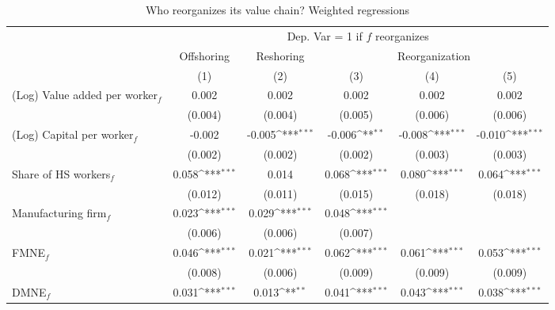 \begin{table}[htbp] \footnotesize \centering
\def\sym#1{\ifmmode^{#1}\else\(^{#1}\)\fi}
\caption{Who reorganizes its value chain? Weighted regressions \label{tab:reg_who_appendix}}
\renewcommand{\arraystretch}{1}
\begin{tabular}{l*{5}{c}}
\toprule
&\multicolumn{5}{c}{Dep. Var = 1 if $ f $ reorganizes} \\
\cmidrule(lr){2-6}
                &\multicolumn{1}{c}{Offshoring}&\multicolumn{1}{c}{Reshoring}&\multicolumn{3}{c}{Reorganization}                      \\\cmidrule(lr){2-2}\cmidrule(lr){3-3}\cmidrule(lr){4-6}
                &\multicolumn{1}{c}{(1)}         &\multicolumn{1}{c}{(2)}         &\multicolumn{1}{c}{(3)}         &\multicolumn{1}{c}{(4)}         &\multicolumn{1}{c}{(5)}         \\
\midrule
(Log) Value added per worker$ _f$&    0.002         &    0.002         &    0.002         &    0.002         &    0.002         \\
                &  (0.004)         &  (0.004)         &  (0.005)         &  (0.006)         &  (0.006)         \\
\addlinespace
(Log) Capital per worker$ _f$&   -0.002         &   -0.005\sym{***}&   -0.006\sym{**} &   -0.008\sym{***}&   -0.010\sym{***}\\
                &  (0.002)         &  (0.002)         &  (0.002)         &  (0.003)         &  (0.003)         \\
\addlinespace
Share of HS workers$ _f$&    0.058\sym{***}&    0.014         &    0.068\sym{***}&    0.080\sym{***}&    0.064\sym{***}\\
                &  (0.012)         &  (0.011)         &  (0.015)         &  (0.018)         &  (0.018)         \\
\addlinespace
Manufacturing firm$ _f$&    0.023\sym{***}&    0.029\sym{***}&    0.048\sym{***}&                  &                  \\
                &  (0.006)         &  (0.006)         &  (0.007)         &                  &                  \\
\addlinespace
FMNE$ _f$       &    0.046\sym{***}&    0.021\sym{***}&    0.062\sym{***}&    0.061\sym{***}&    0.053\sym{***}\\
                &  (0.008)         &  (0.006)         &  (0.009)         &  (0.009)         &  (0.009)         \\
\addlinespace
DMNE$ _f$       &    0.031\sym{***}&    0.013\sym{**} &    0.041\sym{***}&    0.043\sym{***}&    0.038\sym{***}\\

\end{tabular}
\end{table}
